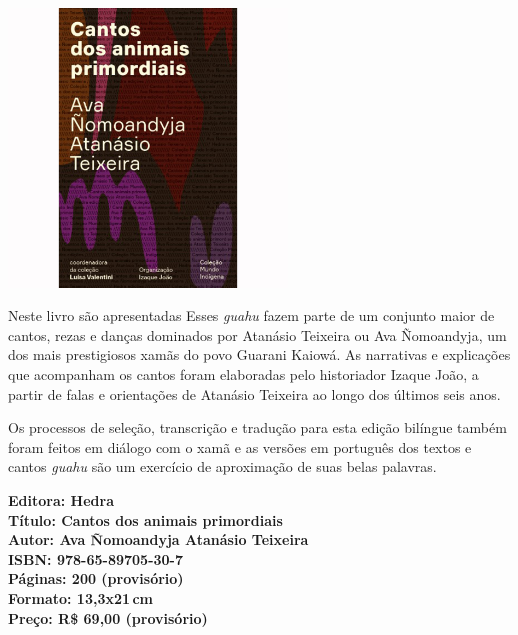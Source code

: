 \begin{center}
\hspace*{-3.6cm}
\hspace*{3.1cm}\includegraphics[width=74mm]{./CAPAS/HEDRA_CANTOS.jpg}
\end{center}
\hspace*{-7cm}\hrulefill\hspace*{-7cm}
\medskip

\noindent{}Neste livro são apresentadas  Esses \textit{guahu} fazem parte de um conjunto maior de cantos, rezas e danças dominados por Atanásio Teixeira ou Ava Ñomoandyja, um dos mais prestigiosos xamãs do povo Guarani Kaiowá. As narrativas e explicações que acompanham os cantos foram elaboradas pelo historiador Izaque João, a partir de falas e orientações de Atanásio Teixeira ao longo dos últimos seis anos. 

Os processos de seleção, transcrição e tradução para esta edição bilíngue também foram feitos em diálogo com o xamã e as versões em português dos textos e cantos \textit{guahu} são um exercício de aproximação de suas belas palavras.

\vfill
\noindent\begin{minipage}[c]{1\linewidth}
{\small\textbf{
\hspace*{-.1cm}Editora: Hedra\\
Título: Cantos dos animais primordiais\\
Autor: Ava Ñomoandyja Atanásio Teixeira\\ 
ISBN: 978-65-89705-30-7\\
Páginas: 200 (provisório)\\
Formato: 13,3x21\,cm\\
Preço: R\$ 69,00 (provisório)\\
}}
\end{minipage}
\pagebreak

